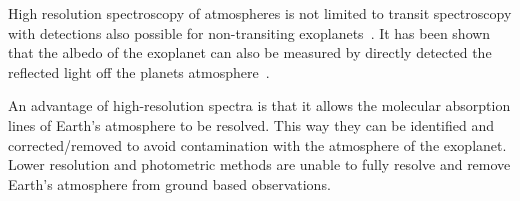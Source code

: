 High resolution spectroscopy of atmospheres is not limited to transit spectroscopy with detections also possible for non-transiting exoplanets~\citep[e.g.][]{brogi_signature_2012, brogi_carbon_2014,lockwood_nearir_2014, piskorz_evidence_2016}.
It has been shown that the albedo of the exoplanet can also be measured by directly detected the reflected light off the planets atmosphere~\citet{martins_evidence_2015, martins_reflected_2016}.

An advantage of high-resolution spectra is that it allows the molecular absorption lines of Earth's atmosphere to be resolved.
This way they can be identified and corrected/removed to avoid contamination with the atmosphere of the exoplanet.
Lower resolution and photometric methods are unable to fully resolve and remove Earth's atmosphere from ground based observations.
